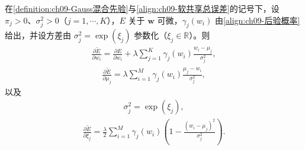 \documentclass[../../main.tex]{subfiles}
\begin{document}
\begin{proposition}[软权重共享的梯度]\label{proposition:ch09-软共享梯度}
在\cref{definition:ch09-Gauss混合先验}与\eqref{align:ch09-软共享总误差}的记号下，设 $\pi_{j}>0$、$\sigma_{j}^{2}>0$（$j=1,\cdots,K$），$E$ 关于 $\boldsymbol{w}$ 可微，$\gamma_{j}(w_{i})$ 由\eqref{align:ch09-后验概率}给出，并设方差由 $\sigma_{j}^{2}=\exp(\xi_{j})$ 参数化（$\xi_{j}\in\mathbb{R}$）。则
\begin{align}
\frac{\partial\widetilde{E}}{\partial w_{i}}=\frac{\partial E}{\partial w_{i}}+\lambda\sum_{j=1}^{K}\gamma_{j}(w_{i})\frac{w_{i}-\mu_{j}}{\sigma_{j}^{2}},
\label{align:ch09-权重梯度}
\end{align}
\begin{align}
\frac{\partial\widetilde{E}}{\partial\mu_{j}}=\lambda\sum_{i=1}^{M}\gamma_{j}(w_{i})\frac{\mu_{j}-w_{i}}{\sigma_{j}^{2}},
\label{align:ch09-均值梯度}
\end{align}
以及
\begin{align}
\sigma_{j}^{2}=\exp(\xi_{j}),
\label{align:ch09-方差参数化}
\end{align}
\begin{align}
\frac{\partial\widetilde{E}}{\partial\xi_{j}}=\frac{\lambda}{2}\sum_{i=1}^{M}\gamma_{j}(w_{i})\left(1-\frac{(w_{i}-\mu_{j})^{2}}{\sigma_{j}^{2}}\right).
\label{align:ch09-方差参数梯度}
\end{align}
\end{proposition}
\end{document}

